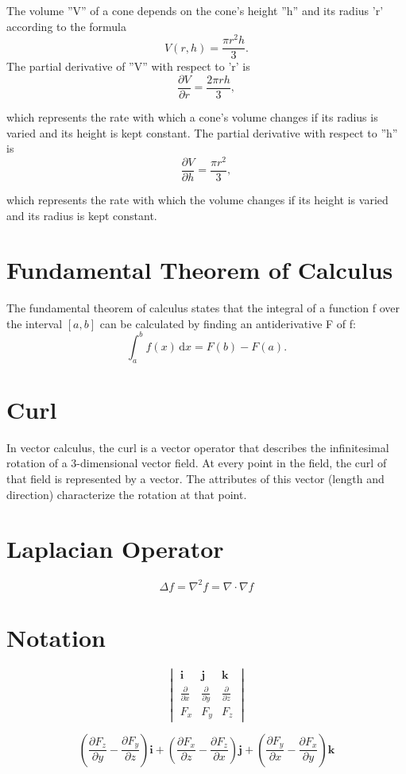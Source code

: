 \documentclass[12pt, a4paper]{article}
\begin{document}
The volume ''V'' of a cone depends on the cone's height ''h'' and its radius 'r' according to the formula
\[V(r, h) = \frac{\pi r^2 h}{3}.\]
The partial derivative of ''V'' with respect to 'r' is
\[\frac{ \partial V}{\partial r} = \frac{ 2 \pi r h}{3},\]

which represents the rate with which a cone's volume changes if its radius is varied and its height is kept constant.
The partial derivative with respect to ''h'' is
\[\frac{ \partial V}{\partial h} = \frac{\pi r^2}{3},\]

which represents the rate with which the volume changes if its height is varied and its radius is kept constant.
\section{Fundamental Theorem of Calculus}
The fundamental theorem of calculus states that the integral of a function f over the interval $[a, b]$ can be calculated by finding an antiderivative F of f:
\[\int_a^b f(x)\,\mathrm dx = F(b) - F(a).\]

\section{Curl}
In vector calculus, the curl is a vector operator that describes the infinitesimal rotation of a 3-dimensional vector field. At every point in the field, the curl of that field is represented by a vector. The attributes of this vector (length and direction) characterize the rotation at that point.
\section{Laplacian Operator}
\[\Delta f = \nabla^2 f = \nabla \cdot \nabla f\]

\section{Notation}
\[ \begin{vmatrix} \mathbf{i} & \mathbf{j} & \mathbf{k} \\
{\frac{\partial}{\partial x}} & {\frac{\partial}{\partial y}} & {\frac{\partial}{\partial z}} \\
 F_x & F_y & F_z \end{vmatrix}\]

\[\left(\frac{\partial F_z}{\partial y}  - \frac{\partial F_y}{\partial z}\right) \mathbf{i} + \left(\frac{\partial F_x}{\partial z} - \frac{\partial F_z}{\partial x}\right) \mathbf{j} + \left(\frac{\partial F_y}{\partial x} - \frac{\partial F_x}{\partial y}\right) \mathbf{k}\]
\end{document}

